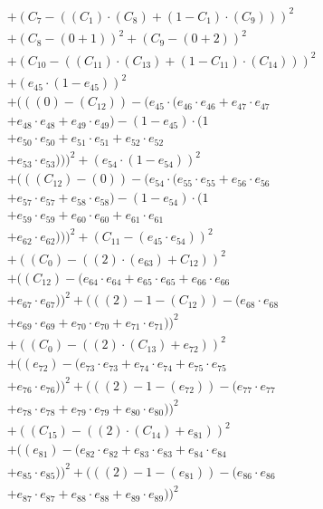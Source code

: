 \documentclass[10pt, a4paper]{article}
\begin{document}
\begin{small}
\begin{align*}
& + (C_{7} - ((C_{1})  \cdot  (C_{8}) + (1 - C_{1})  \cdot  (C_{9})))^{2} \\
& + (C_{8} - (0 + 1))^{2} + (C_{9} - (0 + 2))^{2} \\
& + (C_{10} - ((C_{11})  \cdot  (C_{13}) + (1 - C_{11})  \cdot  (C_{14})))^{2} \\
& + (e_{45} \cdot (1 - e_{45}))^{2} \\
& + (((0) - (C_{12})) - (e_{45} \cdot (e_{46} \cdot e_{46} + e_{47} \cdot e_{47} \\
& + e_{48} \cdot e_{48} + e_{49} \cdot e_{49}) - (1 - e_{45}) \cdot (1 \\
& + e_{50} \cdot e_{50} + e_{51} \cdot e_{51} + e_{52} \cdot e_{52} \\
& + e_{53} \cdot e_{53})))^{2} + (e_{54} \cdot (1 - e_{54}))^{2} \\
& + (((C_{12}) - (0)) - (e_{54} \cdot (e_{55} \cdot e_{55} + e_{56} \cdot e_{56} \\
& + e_{57} \cdot e_{57} + e_{58} \cdot e_{58}) - (1 - e_{54}) \cdot (1 \\
& + e_{59} \cdot e_{59} + e_{60} \cdot e_{60} + e_{61} \cdot e_{61} \\
& + e_{62} \cdot e_{62})))^{2} + (C_{11} - (e_{45} \cdot e_{54}))^{2} \\
& + ((C_{0}) - ((2)  \cdot  (e_{63}) + C_{12}))^{2} \\
& + ((C_{12}) - (e_{64} \cdot e_{64} + e_{65} \cdot e_{65} + e_{66} \cdot e_{66} \\
& + e_{67} \cdot e_{67}))^{2} + (((2) - 1 - (C_{12})) - (e_{68} \cdot e_{68} \\
& + e_{69} \cdot e_{69} + e_{70} \cdot e_{70} + e_{71} \cdot e_{71}))^{2} \\
& + ((C_{0}) - ((2)  \cdot  (C_{13}) + e_{72}))^{2} \\
& + ((e_{72}) - (e_{73} \cdot e_{73} + e_{74} \cdot e_{74} + e_{75} \cdot e_{75} \\
& + e_{76} \cdot e_{76}))^{2} + (((2) - 1 - (e_{72})) - (e_{77} \cdot e_{77} \\
& + e_{78} \cdot e_{78} + e_{79} \cdot e_{79} + e_{80} \cdot e_{80}))^{2} \\
& + ((C_{15}) - ((2)  \cdot  (C_{14}) + e_{81}))^{2} \\
& + ((e_{81}) - (e_{82} \cdot e_{82} + e_{83} \cdot e_{83} + e_{84} \cdot e_{84} \\
& + e_{85} \cdot e_{85}))^{2} + (((2) - 1 - (e_{81})) - (e_{86} \cdot e_{86} \\
& + e_{87} \cdot e_{87} + e_{88} \cdot e_{88} + e_{89} \cdot e_{89}))^{2} \\

\end{align*}
\end{small}
\end{document}
